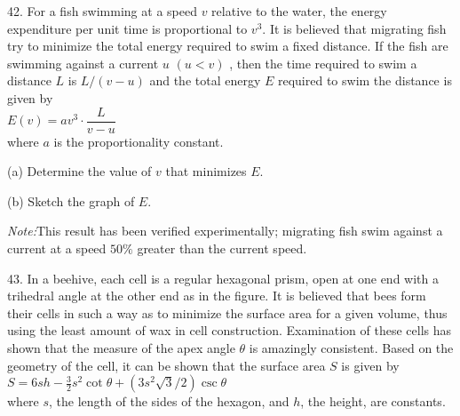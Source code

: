 \documentclass{sebase}
\begin{document}
\begin{multicols}{2}
\begin{ExerciseList}
%

%

\item[\hfill 42.] For a fish swimming at a speed $v$ relative to the water,
the energy expenditure per unit time is proportional to $v^{3}$. It is
believed that migrating fish try to minimize the total energy required to
swim a fixed distance. If the fish are swimming against a current $u$ $(u<v)$%
, then the time required to swim a distance $L$ is $L/(v-u)$ and the total
energy $E$ required to swim the distance is given by\\[6pt]
\hspace*{\fill}$E(v)=av^{3}\cdot \dfrac{L}{v-u}$\hspace*{\fill}\\[6pt]
where $a$ is the proportionality constant.

\begin{ExerciseList}
\item[(a)] Determine the value of $v$ that minimizes $E$.

%

\item[(b)] Sketch the graph of $E$.

%
\vspace{6pt}
\end{ExerciseList}

\textit{Note:}\quad This result has been verified experimentally; migrating
fish swim against a current at a speed $50\%$ greater than the current speed.

\item[\hfill 43.] In a beehive, each cell is a regular hexagonal prism, open
at one end with a trihedral angle at the other end as in the figure. It is
believed that bees form their cells in such a way as to minimize the surface
area for a given volume, thus using the least amount of wax in cell
construction. Examination of these cells has shown that the measure of the
apex angle $\theta $ is amazingly consistent. Based on the geometry of the
cell, it can be shown that the surface area $S$ is given by\\[6pt]
\hspace*{\fill}$S=6sh-\tfrac{3}{2}s^{2}\cot \theta +\left( 3s^{2}\sqrt{3}%
/2\right) \csc \theta $\hspace*{\fill}\\[6pt]
where $s$, the length of the sides of the hexagon, and $h$, the height, are
constants.


\end{ExerciseList}
\end{multicols}
\end{document}
